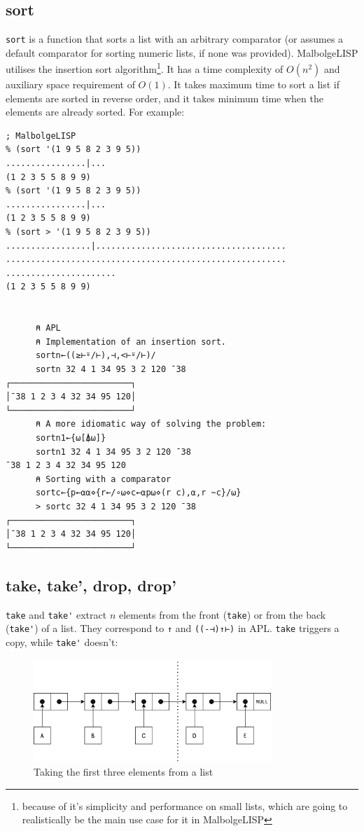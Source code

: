 \subsection{sort}

\par \verb|sort| is a function that sorts a list with an arbitrary comparator (or assumes a default comparator for sorting numeric lists, if none was provided). MalbolgeLISP utilises the insertion sort algorithm\footnote{because of it's simplicity and performance on small lists, which are going to realistically be the main use case for it in MalbolgeLISP}. It has a time complexity of $O(n^2)$ and auxiliary space requirement of $O(1)$. It takes maximum time to sort a list if elements are sorted in reverse order, and it takes minimum time when the elements are already sorted. For example:

\begin{verbatim}
; MalbolgeLISP
% (sort '(1 9 5 8 2 3 9 5))
................|...
(1 2 3 5 5 8 9 9)
% (sort '(1 9 5 8 2 3 9 5))
................|...
(1 2 3 5 5 8 9 9)
% (sort > '(1 9 5 8 2 3 9 5))
.................|......................................
........................................................
......................
(1 2 3 5 5 8 9 9)


      ⍝ APL
      ⍝ Implementation of an insertion sort.
      sortn←((≥⊢⍤/⊢),⊣,<⊢⍤/⊢)/
      sortn 32 4 1 34 95 3 2 120 ¯38
┌────────────────────────┐
│¯38 1 2 3 4 32 34 95 120│
└────────────────────────┘
      ⍝ A more idiomatic way of solving the problem:
      sortn1←{⍵[⍋⍵]}
      sortn1 32 4 1 34 95 3 2 120 ¯38
¯38 1 2 3 4 32 34 95 120
      ⍝ Sorting with a comparator
      sortc←{p←⍺⍺⋄{r←/∘⍵⋄c←⍺p⍵⋄(r c),⍺,r ~c}/⍵}
      > sortc 32 4 1 34 95 3 2 120 ¯38
┌────────────────────────┐
│¯38 1 2 3 4 32 34 95 120│
└────────────────────────┘
\end{verbatim}

\subsection{take, take', drop, drop'}

\par \verb|take| and \verb|take'| extract $n$ elements from the front (\verb|take|) or from the back (\verb|take'|) of a list. They correspond to \verb|↑| and \verb|((-⊣)↑⊢)| in APL. \verb|take| triggers a copy, while \verb|take'| doesn't:

\begin{figure}[H]
\centering
\includegraphics[width=0.8\textwidth]{figures/take.png}
\caption{Taking the first three elements from a list}
\end{figure}

